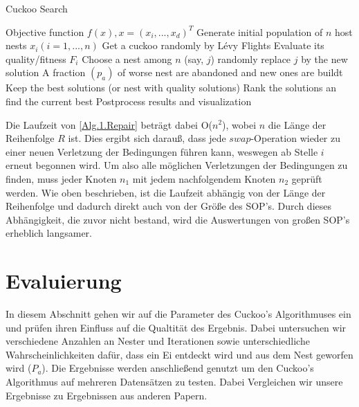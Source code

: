 \documentclass[conference]{IEEEtran}
\begin{document}
      \begin{algorithm}
        \caption{Cuckoo Search}\label{2}
        \begin{algorithmic}[1]
        \State Objective function $f(x), x = (x_{i}, ...,x_{d})^T$
        \State Generate initial population of $n$ host nests $x_{i} (i =1,...,n)$
          \State Get a cuckoo randomly by Lévy Flights
          \State Evaluate its quality/fitness $F_{i}$
          \State Choose a nest among $n$ (say, $j$) randomly
            \State replace $j$ by the new solution
          \EndIf
          \State A fraction $(p_{a})$ of worse nest are abandoned 
          \State and new ones are buildt 
          \State Keep the best solutions (or nest with quality solutions)
          \State Rank the solutions an find the current best
        \EndWhile
        \State Postprocess results and visualization
        
        \end{algorithmic}
        \end{algorithm}

      Die Laufzeit von \ref{Alg.1.Repair} beträgt dabei O($n^2$), wobei $n$ die Länge der Reihenfolge $R$ ist. Dies ergibt sich darauß, dass
      jede $swap$-Operation wieder zu einer neuen Verletzung der Bedingungen führen kann, weswegen ab Stelle $i$ erneut begonnen wird. Um also alle möglichen Verletzungen
      der Bedingungen zu finden, muss jeder Knoten $n_1$ mit jedem nachfolgendem Knoten $n_2$ geprüft werden. 
      Wie oben beschrieben, ist die Laufzeit abhängig von der Länge der Reihenfolge und dadurch direkt auch von der Größe des SOP's. 
      Durch dieses Abhängigkeit, die zuvor nicht bestand, wird die Auswertungen von großen SOP's erheblich langsamer. 


  \section{Evaluierung}
    In diesem Abschnitt gehen wir auf die Parameter des Cuckoo's Algorithmuses ein und prüfen ihren Einfluss auf die Qualtität des Ergebnis.
    Dabei untersuchen wir verschiedene Anzahlen an Nester und Iterationen sowie unterschiedliche Wahrscheinlichkeiten dafür, dass ein Ei entdeckt wird 
    und aus dem Nest geworfen wird ($P_a$). Die Ergebnisse werden anschließend genutzt um den Cuckoo's Algorithmus auf mehreren 
    Datensätzen zu testen. Dabei Vergleichen wir unsere Ergebnisse zu Ergebnissen aus anderen Papern. 
\end{document}
